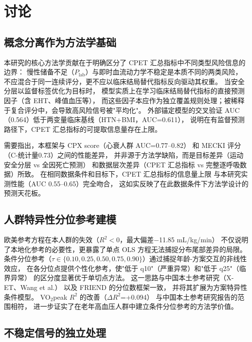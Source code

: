 \documentclass[12pt, a4paper]{ctexart}
\begin{document}
\section{讨论}

\subsection{概念分离作为方法学基础}

本研究的核心方法学贡献在于明确区分了 CPET 汇总指标中不同类型风险信息的边界：
慢性储备不足（$P_{\text{lab}}$）与即时血流动力学不稳定是本质不同的两类风险，
不应混合于同一连续评分，更不应以临床结局替代指标反向驱动其权重\cite{Ross2024}。
当安全分层以监督标签优化为目标时，
模型实质上在学习临床结局替代指标的直接预测因子（含 EHT、峰值血压等），
而这些因子本应作为独立覆盖规则处理；被稀释于复合评分中，会导致高风险信号被"平均化"。
外部锚定模型的交叉验证 AUC（0.564）低于两变量临床基线（HTN+BMI，AUC=0.611），
说明在有监督预测路径下，CPET 汇总指标的可提取信息量存在上限。

需要指出，本框架与 CPX score\cite{Gorodeski2008cpx}（心衰人群 AUC=0.77--0.82）
和 MECKI 评分\cite{MECKI2023}（C-统计量0.73）之间的性能差异，
并非源于方法学缺陷，而是目标差异（运动安全分层 vs 全因死亡预测）
和数据层次差异（CPET 汇总指标 vs 完整逐呼吸数据）所致。
在相同数据条件和目标下，CPET 汇总指标的信息量上限
与本研究实测性能（AUC 0.55--0.65）完全吻合，
这如实反映了在此数据条件下方法学设计的预测天花板。

\subsection{人群特异性分位参考建模}

欧美参考方程在本人群的失效（$R^2<0$，最大偏差$-$11.85 mL/kg/min）
不仅说明了本地化参考的必要性，更暴露了单点 OLS 方程无法捕捉分布尾部差异的局限。
条件分位参考（$\tau \in \{0.10, 0.25, 0.50, 0.75, 0.90\}$）通过捕捉年龄-方案交互的非线性效应，
在各分位点提供个性化参考，使"低于 q10"（严重异常）和"低于 q25"（临界异常）
的区分度显著优于单切点方法。
这一思路与中国本土参考研究（X-ET\cite{XET2021}、Wang et al.\cite{WangCycle2022}）
以及 FRIEND\cite{FRIEND2022} 的分位数框架一致，
并将其扩展为方案特异性条件模型。
VO$_2$peak $R^2$ 的改善（$\Delta R^2$=+0.094）
与中国本土参考研究报告的范围相符，
进一步证实了在老年高血压人群中建立条件分位参考的方法学价值。

\subsection{不稳定信号的独立处理}
\end{document}
